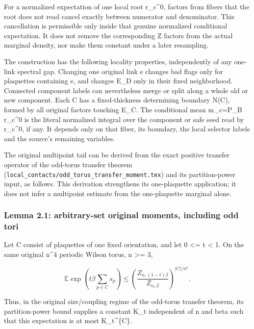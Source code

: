\documentclass[
  11pt,
]{article}
\begin{document}
For a normalized expectation of one local root r\_c\^{}0, factors from
fibers that the root does not read cancel exactly between numerator and
denominator. This cancellation is permissible only inside that genuine
normalized conditional expectation. It does not remove the corresponding
Z factors from the actual marginal density, nor make them constant under
a later resampling.

The construction has the following locality properties, independently of
any one-link spectral gap. Changing one original link e changes bad
flags only for plaquettes containing e, and changes E\_D only in their
fixed neighborhood. Connected component labels can nevertheless merge or
split along a whole old or new component. Each C has a fixed-thickness
determining boundary N(C), formed by all original factors touching E\_C.
The conditional mean m\_c=P\_B r\_c\^{}0 is the literal normalized
integral over the component or safe seed read by r\_c\^{}0, if any. It
depends only on that fiber, its boundary, the local selector labels and
the source's remaining variables.

The original multipoint tail can be derived from the exact positive
transfer operator of the odd-torus transfer theorem (\texttt{local\_contacts/odd\_torus\_transfer\_moment.tex}) and its partition-power input, as follows. This
derivation strengthens its one-plaquette application; it does not infer
a multipoint estimate from the one-plaquette marginal alone.

\hypertarget{lemma-2.1-arbitrary-set-original-moments-including-odd-tori}{%
\subsubsection{Lemma 2.1: arbitrary-set original moments, including odd
tori}\label{lemma-2.1-arbitrary-set-original-moments-including-odd-tori}}

Let C consist of plaquettes of one fixed orientation, and let 0
\textless= t \textless{} 1. On the same original n\^{}4 periodic Wilson
torus, n \textgreater= 3,

\[
 \mathbb E\exp\!\left(t\beta\sum_{p\in C}s_p\right)
 \le\left(\frac{Z_{n,(1-t)\beta}}{Z_{n,\beta}}\right)^{|C|/n^4}.
 \tag{2.2}
\]

Thus, in the original size/coupling regime of the odd-torus transfer theorem, its partition-power bound
supplies a constant K\_t independent of n and beta such that this
expectation is at most K\_t\^{}\{\textbar C\textbar\}.
\end{document}
